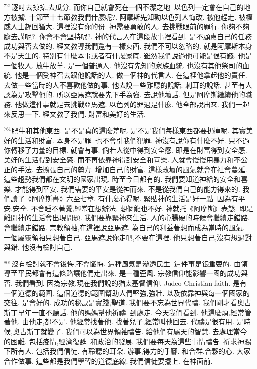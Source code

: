 \documentclass{book}
\begin{document}
$^{721}$逐吋去掠掠,去瓜分.
而你自己就會死在一個不潔之地.
以色列一定會在自己的地方被擄.
十節至十七節教我們什麼呢?.
阿摩斯先知勸以色列人悔改.
被他趕走.
被權威人士趕回猶大.
這裡沒有你的份.
神需要勇敢的人.
去挑戰眼前的罪行.
你夠不夠膽去講呢?.
你會不會堅持呢?.
神的代言人在這段故事裡看到.
是不顧慮自己的任務成功與否去做的.
經文教導我們還有一樣東西.
我們不可以忽略的.
就是阿摩斯本身不是天生的.
特別有什麼本事或者有什麼家底.
雖然我們說過他可能是很有錢.
他是一個牧人.
放牛放羊.
是一個普通人.
他沒有先知的家族血統.
也沒有其他祭司的血統.
他是一個受神召去跟他說話的人.
做一個神的代言人.
在這裡他拿起他的責任.
去做一些當時的人不喜歡他做的事.
他去說一些難聽的說話.
刺耳的說話.
甚至有人認為是攻擊他的.
所以亞馬遮就要先下手為強.
去說他壞話.
但是阿摩斯繼續他的職務.
他做這件事就是去挑戰亞馬遮.
以色列的罪過是什麼.
他全部說出來.
我們一起來反思一下.
經文教了我們.
財富和美好的生活.

$^{761}$肥牛和其他東西.
是不是真的這麼差呢.
是不是我們每樣東西都要扔掉呢.
其實美好的生活和財富.
本身不是罪.
也不會引我們犯罪.
神沒有說你有什麼不好.
只不過你轉移了力量的目標.
就會有事.
倘若人從中得到安全感.
即是在財富得到安全感.
美好的生活得到安全感.
而不再依靠神得到安全和喜樂.
人就會慢慢用暴力和不公正的手法.
去擴張自己的勢力.
增加自己的財富.
這樣敗壞的風氣就會在社會蔓延.
這些趨勢我們都在文明的國家出現.
時至今日都有的.
我們要知道神給的安全和喜樂.
才能得到平安.
我們需要的平安是從神而來.
不是從我們自己的能力得來的.
我們讀了《阿摩斯書》六至七章.
有什麼心得呢.
緊貼神的生活是好一點.
因為有平安,安全.
不會睡不著覺,經常在想辦法.
想個龍也不好.
神就托《阿摩斯》表態.
即是離開神的生活會出現問題.
我們要靠緊神來生活.
人的心腸硬的時候會繼續走錯路.
會繼續走錯路.
宗教領袖,在這裡說亞馬遮.
為自己的利益著想而成為當時的風氣.
一個屬靈領袖只想著自己.
亞馬遮說你走吧,不要在這裡.
他只想著自己,沒有想過對與錯.
他沒有檢討自己.

$^{801}$沒有檢討就不會後悔,不會懺悔.
這種風氣是滲透民生.
這件事是很重要的.
由領導至平民都會有這條路讓他們走出來.
是一種歪風.
宗教信仰能影響一國的成功與否.
我們看到.
因為宗教,現在我們說的猶太基督信仰.
Judeo-Christian faith.
是有一個道德的範圍.
這個道德的範圍幫助人們堅強,強壯.
以及依靠神與每一個國家的交往.
是會好的.
成功的秘訣是實踐,聖道.
我們要不忘為世界代禱.
我們剛才看奧古斯丁早年一直不聽話.
他的媽媽幫他祈禱.
到處走.
今天我們看到.
他這麼煩,經常管著他.
由他走,都不是.
他經常找著他.
找著兒子,經常叫他回去.
代禱是很有用.
是時候,奧古斯丁就變了.
我們可以為世界領袖禱告.
給他們有屬天的智慧.
去處理當今的困難.
包括疫情,經濟復甦.
和政治的發展.
我們要每天為這些事情禱告.
祈求神賜下所有人.
包括我們信徒.
有聆聽的耳朵.
辦事,得力的手腳.
和合群,合夥的心.
大家合作做事.
這些都是我們學習的道德底線.
我們信徒要擺上.
在神面前.
\end{document}
